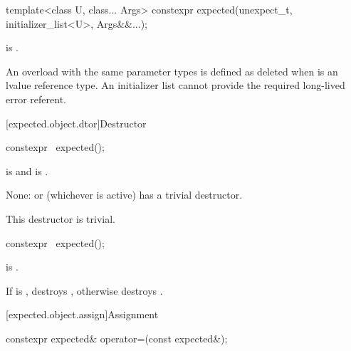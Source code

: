 %
\begin{itemdecl}
template<class U, class... Args>
constexpr expected(unexpect_t, initializer_list<U>, Args&&...);
\end{itemdecl}

\begin{itemdescr}
\pnum
\constraints
{} is .

\pnum
\remarks
An overload with the same parameter types is defined as deleted when  is an lvalue reference type. An initializer list cannot provide the required long-lived error referent.
\end{itemdescr}

[expected.object.dtor]{Destructor}

%
\begin{itemdecl}
constexpr ~expected();
\end{itemdecl}

\begin{itemdescr}
\pnum
\constraints
{} is  and  is .

\pnum
\effects
None:  or  (whichever is active) has a trivial destructor.

\pnum
\remarks
This destructor is trivial.
\end{itemdescr}

%
\begin{itemdecl}
constexpr ~expected();
\end{itemdecl}

\begin{itemdescr}
\pnum
\constraints
{} is .

\pnum
\effects
If  is , destroys , otherwise destroys .
\end{itemdescr}

[expected.object.assign]{Assignment}

%
\begin{itemdecl}
constexpr expected& operator=(const expected&);
\end{itemdecl}


